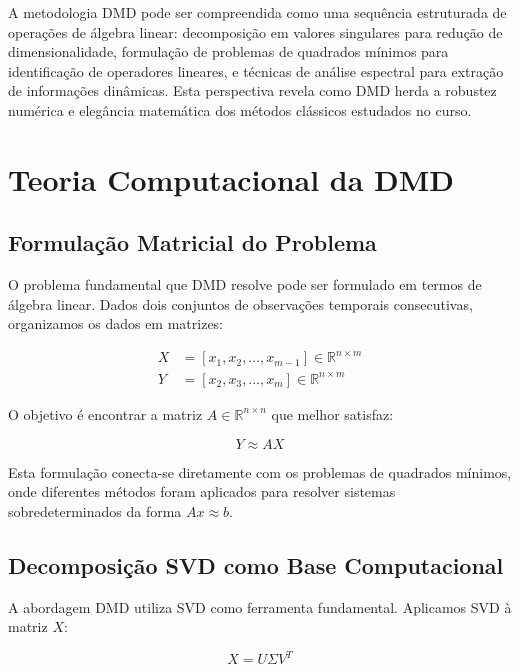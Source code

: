 \documentclass[a4,11pt]{pssbmac}
\begin{document}
A metodologia DMD pode ser compreendida como uma sequência estruturada de operações de álgebra linear: decomposição em valores singulares para redução de dimensionalidade, formulação de problemas de quadrados mínimos para identificação de operadores lineares, e técnicas de análise espectral para extração de informações dinâmicas. Esta perspectiva revela como DMD herda a robustez numérica e elegância matemática dos métodos clássicos estudados no curso.

\section{Teoria Computacional da DMD}

\subsection{Formulação Matricial do Problema}

O problema fundamental que DMD resolve pode ser formulado em termos de álgebra linear. Dados dois conjuntos de observações temporais consecutivas, organizamos os dados em matrizes:

\begin{align}
X &= [x_1, x_2, \ldots, x_{m-1}] \in \mathbb{R}^{n \times m} \label{eq:X_matrix}\\
Y &= [x_2, x_3, \ldots, x_m] \in \mathbb{R}^{n \times m} \label{eq:Y_matrix}
\end{align}

O objetivo é encontrar a matriz $A \in \mathbb{R}^{n \times n}$ que melhor satisfaz:

\begin{equation}
Y \approx AX \label{eq:fundamental_relation}
\end{equation}

Esta formulação conecta-se diretamente com os problemas de quadrados mínimos, onde diferentes métodos foram aplicados para resolver sistemas sobredeterminados da forma $Ax \approx b$.

\subsection{Decomposição SVD como Base Computacional}

A abordagem DMD utiliza SVD como ferramenta fundamental. Aplicamos SVD à matriz $X$:

\begin{equation}
X = U\Sigma V^T \label{eq:svd_decomposition}
\end{equation}
\end{document}
